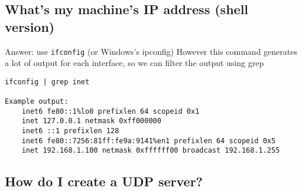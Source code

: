 \begin{Shaded}
\begin{Highlighting}[]
     
     
     \NormalTok{host[}\NormalTok{], port[}\NormalTok{];}
     
         
         
             \NormalTok{(} 
                                \NormalTok{(} 
                                \NormalTok{(} 
            \NormalTok{\}}
        \NormalTok{\}}
\end{Highlighting}
\end{Shaded}

\subsection{What's my machine's IP address (shell
version)}\label{whats-my-machines-ip-address-shell-version}

Answer: use \texttt{ifconfig} (or Windows's ipconfig) However this
command generates a lot of output for each interface, so we can filter
the output using grep

\begin{verbatim}
ifconfig | grep inet

Example output:
    inet6 fe80::1%lo0 prefixlen 64 scopeid 0x1 
    inet 127.0.0.1 netmask 0xff000000 
    inet6 ::1 prefixlen 128 
    inet6 fe80::7256:81ff:fe9a:9141%en1 prefixlen 64 scopeid 0x5 
    inet 192.168.1.100 netmask 0xffffff00 broadcast 192.168.1.255
\end{verbatim}

\subsection{How do I create a UDP
server?}\label{how-do-i-create-a-udp-server}

